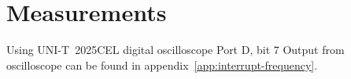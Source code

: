 
\chapter{Measurements}\label{chap:measurements}

Using UNI-T~2025CEL digital oscilloscope
Port D, bit 7
Output from oscilloscope
can be found in appendix~\ref{app:interrupt-frequency}.

